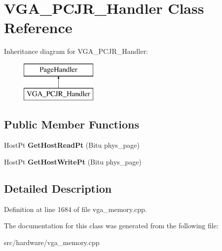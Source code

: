 \hypertarget{classVGA__PCJR__Handler}{\section{V\-G\-A\-\_\-\-P\-C\-J\-R\-\_\-\-Handler Class Reference}
\label{classVGA__PCJR__Handler}
}
Inheritance diagram for V\-G\-A\-\_\-\-P\-C\-J\-R\-\_\-\-Handler\-:\begin{figure}[H]
\begin{center}
\leavevmode
\includegraphics[height=2.000000cm]{classVGA__PCJR__Handler}
\end{center}
\end{figure}
\subsection*{Public Member Functions}
\begin{DoxyCompactItemize}
\item 
\hypertarget{classVGA__PCJR__Handler_a7af2542f4c4e96999dbda7fff177d521}{Host\-Pt {\bfseries Get\-Host\-Read\-Pt} (Bitu phys\-\_\-page)}\label{classVGA__PCJR__Handler_a7af2542f4c4e96999dbda7fff177d521}

\item 
\hypertarget{classVGA__PCJR__Handler_aed69d78cd3e5880a41aa82b1a99d93b3}{Host\-Pt {\bfseries Get\-Host\-Write\-Pt} (Bitu phys\-\_\-page)}\label{classVGA__PCJR__Handler_aed69d78cd3e5880a41aa82b1a99d93b3}

\end{DoxyCompactItemize}


\subsection{Detailed Description}


Definition at line 1684 of file vga\-\_\-memory.\-cpp.



The documentation for this class was generated from the following file\-:\begin{DoxyCompactItemize}
\item 
src/hardware/vga\-\_\-memory.\-cpp\end{DoxyCompactItemize}
